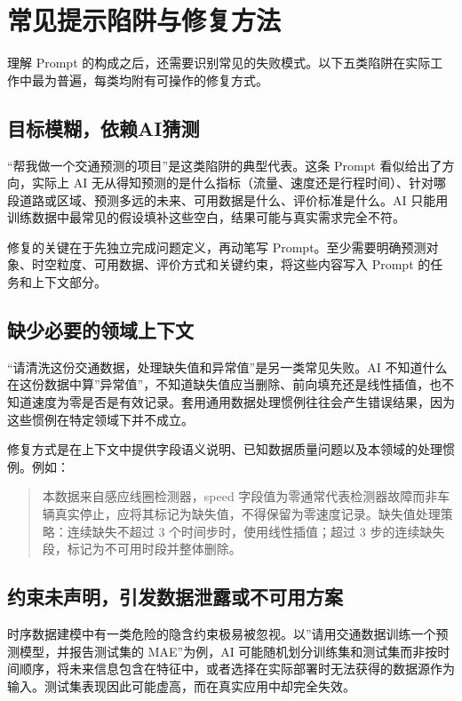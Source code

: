 \section{常见提示陷阱与修复方法}

理解 Prompt 的构成之后，还需要识别常见的失败模式。以下五类陷阱在实际工作中最为普遍，每类均附有可操作的修复方式。

\subsection{目标模糊，依赖AI猜测}

“帮我做一个交通预测的项目”是这类陷阱的典型代表。这条 Prompt 看似给出了方向，实际上 AI 无从得知预测的是什么指标（流量、速度还是行程时间）、针对哪段道路或区域、预测多远的未来、可用数据是什么、评价标准是什么。AI 只能用训练数据中最常见的假设填补这些空白，结果可能与真实需求完全不符。

修复的关键在于先独立完成问题定义，再动笔写 Prompt。至少需要明确预测对象、时空粒度、可用数据、评价方式和关键约束，将这些内容写入 Prompt 的任务和上下文部分。

\subsection{缺少必要的领域上下文}

“请清洗这份交通数据，处理缺失值和异常值”是另一类常见失败。AI 不知道什么在这份数据中算”异常值”，不知道缺失值应当删除、前向填充还是线性插值，也不知道速度为零是否是有效记录。套用通用数据处理惯例往往会产生错误结果，因为这些惯例在特定领域下并不成立。

修复方式是在上下文中提供字段语义说明、已知数据质量问题以及本领域的处理惯例。例如：

\begin{quote}
本数据来自感应线圈检测器，speed 字段值为零通常代表检测器故障而非车辆真实停止，应将其标记为缺失值，不得保留为零速度记录。缺失值处理策略：连续缺失不超过 3 个时间步时，使用线性插值；超过 3 步的连续缺失段，标记为不可用时段并整体删除。
\end{quote}

\subsection{约束未声明，引发数据泄露或不可用方案}

时序数据建模中有一类危险的隐含约束极易被忽视。以”请用交通数据训练一个预测模型，并报告测试集的 MAE”为例，AI 可能随机划分训练集和测试集而非按时间顺序，将未来信息包含在特征中，或者选择在实际部署时无法获得的数据源作为输入。测试集表现因此可能虚高，而在真实应用中却完全失效。


